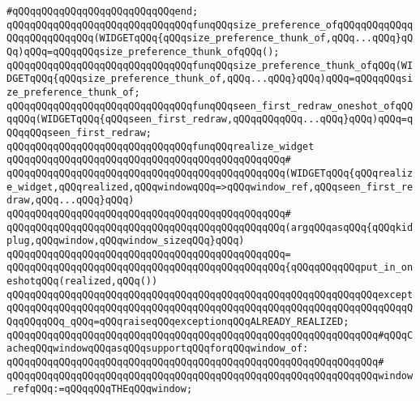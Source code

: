 \verb|#qQQqqQQqqQQqqQQqqQQqqQQqqQQqend;|\newline
\newline
\verb|qQQqqQQqqQQqqQQqqQQqqQQqqQQqqQQqfunqQQqsize_preference_ofqQQqqQQqqQQqqQQqqQQqqQQqqQQq(WIDGETqQQq{qQQqsize_preference_thunk_of,qQQq...qQQq}qQQq)qQQq=qQQqqQQqsize_preference_thunk_ofqQQq();|\newline
\verb|qQQqqQQqqQQqqQQqqQQqqQQqqQQqqQQqfunqQQqsize_preference_thunk_ofqQQq(WIDGETqQQq{qQQqsize_preference_thunk_of,qQQq...qQQq}qQQq)qQQq=qQQqqQQqsize_preference_thunk_of;|\newline
\newline
\verb|qQQqqQQqqQQqqQQqqQQqqQQqqQQqqQQqfunqQQqseen_first_redraw_oneshot_ofqQQqqQQq(WIDGETqQQq{qQQqseen_first_redraw,qQQqqQQqqQQq...qQQq}qQQq)qQQq=qQQqqQQqseen_first_redraw;|\newline
\newline
\verb|qQQqqQQqqQQqqQQqqQQqqQQqqQQqqQQqfunqQQqrealize_widget|\newline
\verb|qQQqqQQqqQQqqQQqqQQqqQQqqQQqqQQqqQQqqQQqqQQqqQQq#|\newline
\verb|qQQqqQQqqQQqqQQqqQQqqQQqqQQqqQQqqQQqqQQqqQQqqQQq(WIDGETqQQq{qQQqrealize_widget,qQQqrealized,qQQqwindowqQQq=>qQQqwindow_ref,qQQqseen_first_redraw,qQQq...qQQq}qQQq)|\newline
\verb|qQQqqQQqqQQqqQQqqQQqqQQqqQQqqQQqqQQqqQQqqQQqqQQq#|\newline
\verb|qQQqqQQqqQQqqQQqqQQqqQQqqQQqqQQqqQQqqQQqqQQqqQQq(argqQQqasqQQq{qQQqkidplug,qQQqwindow,qQQqwindow_sizeqQQq}qQQq)|\newline
\verb|qQQqqQQqqQQqqQQqqQQqqQQqqQQqqQQqqQQqqQQqqQQqqQQq=|\newline
\verb|qQQqqQQqqQQqqQQqqQQqqQQqqQQqqQQqqQQqqQQqqQQqqQQq{qQQqqQQqqQQqput_in_oneshotqQQq(realized,qQQq())|\newline
\verb|qQQqqQQqqQQqqQQqqQQqqQQqqQQqqQQqqQQqqQQqqQQqqQQqqQQqqQQqqQQqqQQqexcept|\newline
\verb|qQQqqQQqqQQqqQQqqQQqqQQqqQQqqQQqqQQqqQQqqQQqqQQqqQQqqQQqqQQqqQQqqQQqqQQqqQQqqQQq_qQQq=qQQqraiseqQQqexceptionqQQqALREADY_REALIZED;|\newline
\newline
\verb|qQQqqQQqqQQqqQQqqQQqqQQqqQQqqQQqqQQqqQQqqQQqqQQqqQQqqQQqqQQqqQQq#qQQqCacheqQQqwindowqQQqasqQQqsupportqQQqforqQQqwindow_of:|\newline
\verb|qQQqqQQqqQQqqQQqqQQqqQQqqQQqqQQqqQQqqQQqqQQqqQQqqQQqqQQqqQQqqQQq#|\newline
\verb|qQQqqQQqqQQqqQQqqQQqqQQqqQQqqQQqqQQqqQQqqQQqqQQqqQQqqQQqqQQqqQQqwindow_refqQQq:=qQQqqQQqTHEqQQqwindow;|\newline
